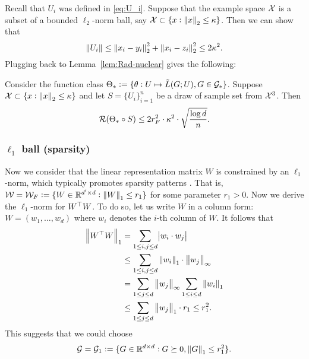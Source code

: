 Recall that $U_i$ was defined in \eqref{eq:U_i}. Suppose that the example space $\mathcal{X}$ is a subset of a bounded $\ell_2$-norm ball, say $\mathcal{X} \subset \{x: \left\lVert x \right\rVert_{2} \leq \kappa\}$. Then we can show that
\begin{equation*}
\left\lVert U_i \right\rVert \leq \left\lVert x_i - y_i \right\rVert_{2}^2 + \left\lVert x_i - z_i \right\rVert_{2}^2 \leq 2 \kappa^2.
\end{equation*}
Plugging back to Lemma~\ref{lem:Rad-nuclear} gives the following:
\begin{corollary}\label{cor:nuclear}
Consider the function class $\Theta_* := \{ \theta: U \mapsto \tilde{L}(G; U), G \in \mathcal{G}_* \}$. Suppose $\mathcal{X} \subset \{x: \left\lVert x \right\rVert_{2} \leq \kappa\}$ and let $S = \{U_i\}_{i=1}^n$ be a draw of sample set from $\mathcal{X}^3$. Then
\begin{equation*}
\mathcal{R}(\Theta_* \circ S) \leq 2 r^2_F \cdot \kappa^2 \cdot \sqrt{\frac{\log d}{n}}.
\end{equation*}
\end{corollary}


\subsubsection{$\ell_1$ ball (sparsity)}

Now we consider that the linear representation matrix $W$ is constrained by an $\ell_1$-norm, which typically promotes sparsity patterns \citep{tibshirani1996regression,chen1998atomic,candes2005decoding}. That is, $\mathcal{W} = \mathcal{W}_F := \{W \in \mathbb{R}^{d' \times d}: \left\lVert W \right\rVert_{1} \leq r_1\}$ for some parameter $r_1 > 0$. Now we derive the $\ell_1$-norm for $W^{\top} W$. To do so, let us write $W$ in a column form: $W = (w_1, \dots, w_{d})$ where $w_i$ denotes the $i$-th column of $W$. It follows that
\begin{align*}
\left\lVert W^{\top} W \right\rVert_{1} &= \sum_{1 \leq i, j \leq d} \abs{w_i \cdot w_j} \\
&\leq \sum_{1 \leq i, j \leq d} \left\lVert w_i \right\rVert_{1} \cdot \left\lVert w_j \right\rVert_{\infty}\\
&= \sum_{1 \leq j \leq d} \left\lVert w_j \right\rVert_{\infty} \sum_{1 \leq i \leq d} \left\lVert w_i \right\rVert_{1}\\
&\leq \sum_{1 \leq j \leq d} \left\lVert w_j \right\rVert_{1} \cdot r_1 \leq r_1^2.
\end{align*}
This suggests that we could choose 
\begin{equation}
\mathcal{G} = \mathcal{G}_1 := \{G \in \mathbb{R}^{d \times d}: G \succeq 0, \left\lVert G \right\rVert_{1} \leq r_1^2\}.
\end{equation}

